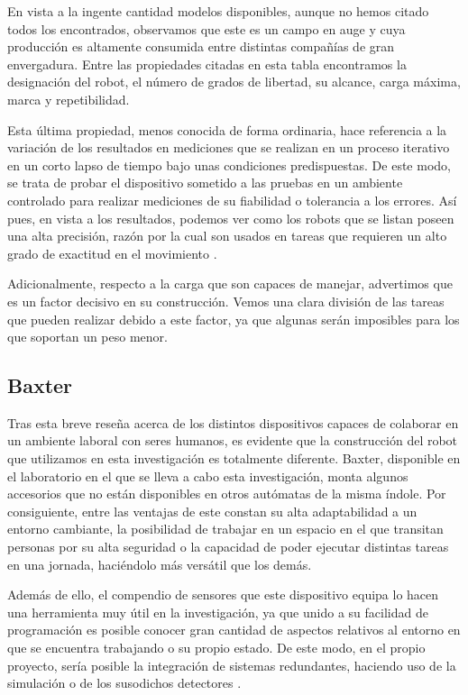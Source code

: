 En vista a la ingente cantidad modelos disponibles, aunque no hemos citado todos los encontrados, observamos que este es un campo en auge y cuya producción es altamente consumida entre distintas compañías de gran envergadura. Entre las propiedades citadas en esta tabla encontramos la designación del robot, el número de grados de libertad, su alcance, carga máxima, marca y repetibilidad.

Esta última propiedad, menos conocida de forma ordinaria, hace referencia a la variación de los resultados en mediciones que se realizan en un proceso iterativo en un corto lapso de tiempo bajo unas condiciones predispuestas. De este modo, se trata de probar el dispositivo sometido a las pruebas en un ambiente controlado para realizar mediciones de su fiabilidad o tolerancia a los errores. Así pues, en vista a los resultados, podemos ver como los robots que se listan poseen una alta precisión, razón por la cual son usados en tareas que requieren un alto grado de exactitud en el movimiento \cite{61}.

Adicionalmente, respecto a la carga que son capaces de manejar, advertimos que es un factor decisivo en su construcción. Vemos una clara división de las tareas que pueden realizar debido a este factor, ya que algunas serán imposibles para los que soportan un peso menor.

\subsection{Baxter}

Tras esta breve reseña acerca de los distintos dispositivos capaces de colaborar en un ambiente laboral con seres humanos, es evidente que la construcción del robot que utilizamos en esta investigación es totalmente diferente. Baxter, disponible en el laboratorio en el que se lleva a cabo esta investigación, monta algunos accesorios que no están disponibles en otros autómatas de la misma índole. Por consiguiente, entre las ventajas de este constan su alta adaptabilidad a un entorno cambiante, la posibilidad de trabajar en un espacio en el que transitan personas por su alta seguridad o la capacidad de poder ejecutar distintas tareas en una jornada, haciéndolo más versátil que los demás. 

Además de ello, el compendio de sensores que este dispositivo equipa lo hacen una herramienta muy útil en la investigación, ya que unido a su facilidad de programación es posible conocer gran cantidad de aspectos relativos al entorno en que se encuentra trabajando o su propio estado. De este modo, en el propio proyecto, sería posible la integración de sistemas redundantes, haciendo uso de la simulación o de los susodichos detectores \cite{62,63}. 

